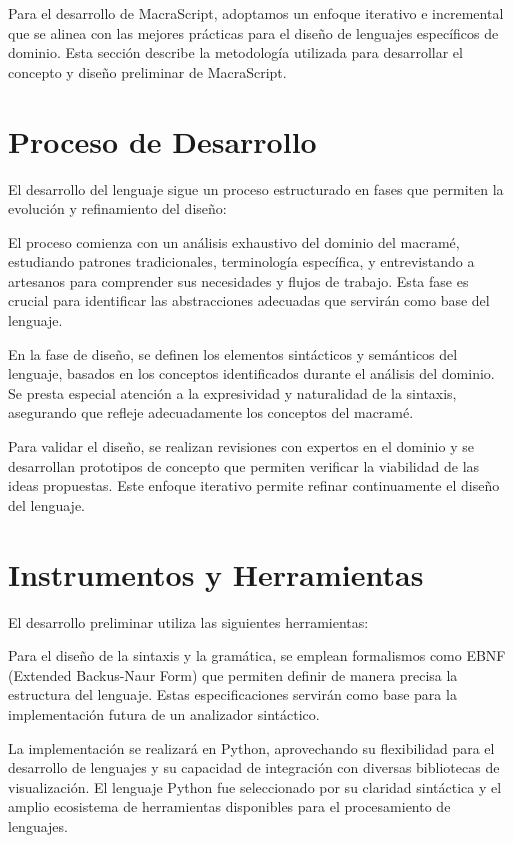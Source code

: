 \documentclass[12pt,a4paper]{report}
\begin{document}
Para el desarrollo de MacraScript, adoptamos un enfoque iterativo e incremental que se alinea con las mejores prácticas para el diseño de lenguajes específicos de dominio. Esta sección describe la metodología utilizada para desarrollar el concepto y diseño preliminar de MacraScript.

\section{Proceso de Desarrollo}
El desarrollo del lenguaje sigue un proceso estructurado en fases que permiten la evolución y refinamiento del diseño:

El proceso comienza con un análisis exhaustivo del dominio del macramé, estudiando patrones tradicionales, terminología específica, y entrevistando a artesanos para comprender sus necesidades y flujos de trabajo. Esta fase es crucial para identificar las abstracciones adecuadas que servirán como base del lenguaje.

En la fase de diseño, se definen los elementos sintácticos y semánticos del lenguaje, basados en los conceptos identificados durante el análisis del dominio. Se presta especial atención a la expresividad y naturalidad de la sintaxis, asegurando que refleje adecuadamente los conceptos del macramé.

Para validar el diseño, se realizan revisiones con expertos en el dominio y se desarrollan prototipos de concepto que permiten verificar la viabilidad de las ideas propuestas. Este enfoque iterativo permite refinar continuamente el diseño del lenguaje.

\section{Instrumentos y Herramientas}
El desarrollo preliminar utiliza las siguientes herramientas:

Para el diseño de la sintaxis y la gramática, se emplean formalismos como EBNF (Extended Backus-Naur Form) que permiten definir de manera precisa la estructura del lenguaje. Estas especificaciones servirán como base para la implementación futura de un analizador sintáctico.

La implementación se realizará en Python, aprovechando su flexibilidad para el desarrollo de lenguajes y su capacidad de integración con diversas bibliotecas de visualización. El lenguaje Python fue seleccionado por su claridad sintáctica y el amplio ecosistema de herramientas disponibles para el procesamiento de lenguajes.
\end{document}
